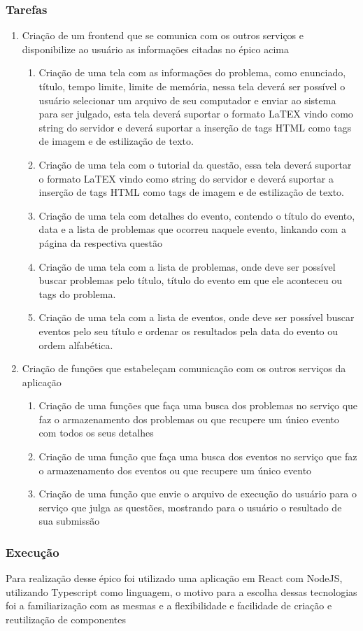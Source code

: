 \subsubsection{Tarefas}
\begin{enumerate}

    \item Criação de um frontend que se comunica com os outros serviços e disponibilize ao usuário as informações citadas no épico acima
    \begin{enumerate}
        \item Criação de uma tela com as informações do problema, como enunciado, título, tempo limite, limite de memória, nessa tela deverá ser possível o usuário selecionar um arquivo de seu computador e enviar ao sistema para ser julgado, esta tela deverá suportar o formato LaTEX vindo como string do servidor e deverá suportar a inserção de tags HTML como tags de imagem e de estilização de texto.
        \item Criação de uma tela com o tutorial da questão, essa tela deverá suportar o formato LaTEX vindo como string do servidor e deverá suportar a inserção de tags HTML como tags de imagem e de estilização de texto.
        \item Criação de uma tela com detalhes do evento, contendo o título do evento, data e a lista de problemas que ocorreu naquele evento, linkando com a página da respectiva questão
        \item Criação de uma tela com a lista de problemas, onde deve ser possível buscar problemas pelo título, título do evento em que ele aconteceu ou tags do problema.
        \item Criação de uma tela com a lista de eventos, onde deve ser possível buscar eventos pelo seu título e ordenar os resultados pela data do evento ou ordem alfabética.
    \end{enumerate}
    \item Criação de funções que estabeleçam comunicação com os outros serviços da aplicação
    \begin{enumerate}
        \item Criação de uma funções que faça uma busca dos problemas no serviço que faz o armazenamento dos problemas ou que recupere um único evento com todos os seus detalhes
        \item Criação de uma função que faça uma busca dos eventos no serviço que faz o armazenamento dos eventos ou que recupere um único evento
        \item Criação de uma função que envie o arquivo de execução do usuário para o serviço que julga as questões, mostrando para o usuário o resultado de sua submissão 
    \end{enumerate}
\end{enumerate}

\subsubsection{Execução}

Para realização desse épico foi utilizado uma aplicação em React com NodeJS, utilizando Typescript como linguagem, o motivo para a escolha dessas tecnologias foi a familiarização com as mesmas e a flexibilidade e facilidade de criação e reutilização de componentes